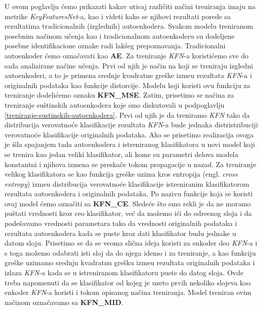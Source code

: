 \documentclass{article}
\begin{document}
	U ovom poglavlju \'cemo prikazati kakav uticaj razli\v citi na\v cini treniranja imaju na metrike \emph{KeyFeaturesNet}-a, kao i videti kako se njihovi rezultati porede sa rezultatima tradicionalnih (izglednih) autoenkodera. 
	Svakom modelu treniranom posebnim na\v cinom u\v cenja kao i tradicionalnom autoenkoderu su dodeljene posebne identifikacione oznake radi lak\v seg prepoznavanja. 
	Tradicionalni autoenkoder \'cemo ozna\v cavati kao \textbf{AE}. 
	Za treniranje \emph{KFN}-a koristi\'cemo sve do sada  analizirane na\v cine u\v cenja. 
	Prvi od njih je na\v cin na koji se treniraju izgledni autoenkoderi, a to je primena srednje kvadratne gre\v ske izme\dj u rezultata \emph{KFN}-a i originalnih podataka kao funkcije distorcije.
	Modelu koji koristi ovu funkciju za treniranje dodeli\'cemo oznaku \textbf{KFN\_MSE}.
	Zatim, prisetimo se na\v cina za treniranje su\v stinskih autoenkodera koje smo diskutovali u podpoglavlju \ref{treniranje-sustinskih-autoenkodera}.
	Prvi od njih je da treniramo \emph{KFN} tako da distribucija verovatno\'ce klasifikacije rezultata \emph{KFN}-a bude jednaka distristribuciji verovatno\'ce klasifikacije originalnih podataka.
	Ako se prisetimo realizacija ovoga je i\v sla spajanjem tada autoenkodera i istreniranog klasifikatora u novi model koji se trenira kao jedan veliki klasifikator, ali kome su parametri delova modela konstantni i njihova izmena se preska\v ce tokom propagacije u nazad.
	Za treniranje velikog klasifikatora se kao funkcija gre\v ske uzima kros entropija (engl. \emph{cross entropy}) izme\dj u distribucija verovatno\'ce klasifikacije istreniranim klasifikatorom rezultata autoenkodera i originalnih podataka. 
	Po nazivu funkcije koja se koristi ovaj model \'cemo ozna\v citi sa \textbf{KFN\_CE}. 
	Slede\'ce \v sto smo rekli je da ne moramo pu\v stati vrednosti kroz ceo klasifikator, ve\'c da mo\v zemo i\'ci do odre\dj enog sloja i da pode\v savamo vrednosti parametara tako da vrednosti originalnih podataka i rezultata autoenkodera kada se puste kroz dati klasifikator budu jednake u datom sloju.
	Prisetimo se da se veoma sli\v cna ideja koristi za enkoder deo \emph{KFN}-a i s toga mo\v zemo odabrati isti sloj da do njega idemo i za treniranje, a kao funkciju gre\v ske uzimamo srednju kvadratnu gre\v sku izme\dj u rezultata originalnih podataka i izlaza \emph{KFN}-a kada se u istreniranom klasifikatoru puste do datog sloja. 
	Ovde treba napomenuti da se klasifikator od kojeg je uzeto prvih nekoliko slojeva kao enkoder \emph{KFN}-a koristi i tokom opisanog na\v cina treniranja.
	Model treniran ovim na\v cinom ozna\v cavamo sa \textbf{KFN\_MID}.
\end{document}
